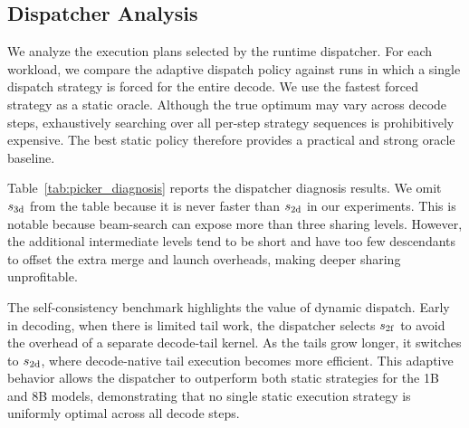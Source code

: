 \documentclass[11pt]{article}
\begin{document}
\begin{table}[t]
\centering
\caption{\label{tab:time-breakdown}
Timing breakdown for Llama-3.1-8B on \texttt{beam-search}. 
Build metadata and decision time capture CPU overhead, with decision time corresponding to kernel-strategy selection. 
Forward time is the model forward-pass GPU computation time. 
All times are reported in milliseconds.
}
\end{table}

\subsection{Dispatcher Analysis}
We analyze the execution plans selected by the runtime dispatcher. For each workload, we compare the adaptive dispatch policy against runs in which a single dispatch strategy is forced for the entire decode. We use the fastest forced strategy as a static oracle. Although the true optimum may vary across decode steps, exhaustively searching over all per-step strategy sequences is prohibitively expensive. The best static policy therefore provides a practical and strong oracle baseline.

Table~\ref{tab:picker_diagnosis} reports the dispatcher diagnosis results.
We omit $s_{\rm 3d}$ from the table because it is never faster than $s_{\rm 2d}$ in our experiments. This is notable because beam-search can expose more than three sharing levels. However, the additional intermediate levels tend to be short and have too few descendants to offset the extra merge and launch overheads, making deeper sharing unprofitable.

The self-consistency benchmark highlights the value of dynamic dispatch. Early in decoding, when there is limited tail work, the dispatcher selects $s_{\rm 2f}$ to avoid the overhead of a separate decode-tail kernel. As the tails grow longer, it switches to $s_{\rm 2d}$, where decode-native tail execution becomes more efficient. This adaptive behavior allows the dispatcher to outperform both static strategies for the 1B and 8B models, demonstrating that no single static execution strategy is uniformly optimal across all decode steps.
\end{document}
